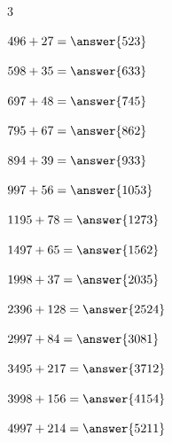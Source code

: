 \documentclass{ximera}
\begin{document}
\begin{oefening}{\oefB\ESS}
\begin{multicols}{3}
    \begin{question} \(496+27=\answer{523}\) \end{question}
    
    \begin{question} \(598+35=\answer{633}\) \end{question}
    
    \begin{question} \(697+48=\answer{745}\) \end{question}
    
    \begin{question} \(795+67=\answer{862}\) \end{question}
    
    \begin{question} \(894+39=\answer{933}\) \end{question}
    
    \begin{question} \(997+56=\answer{1053}\) \end{question}
    
    \begin{question} \(1195+78=\answer{1273}\) \end{question}
    
    \begin{question} \(1497+65=\answer{1562}\) \end{question}
    
    \begin{question} \(1998+37=\answer{2035}\) \end{question}
    
    \begin{question} \(2396+128=\answer{2524}\) \end{question}
    
    \begin{question} \(2997+84=\answer{3081}\) \end{question}
    
    \begin{question} \(3495+217=\answer{3712}\) \end{question}
    
    \begin{question} \(3998+156=\answer{4154}\) \end{question}
    
    \begin{question} \(4997+214=\answer{5211}\) \end{question}
    

\end{multicols}
\end{oefening}
\end{document}

